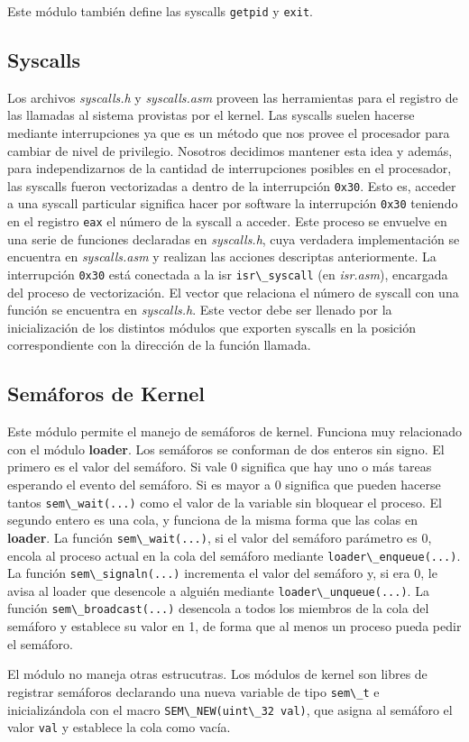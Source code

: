 \documentclass[a4paper]{article}
\newcommand{\file}[1]{\textit{#1}}
\newcommand{\func}[1]{\lstinline{#1}}
\begin{document}
Este módulo también define las syscalls \func{getpid} y \func{exit}.


\subsection{Syscalls}

Los archivos \file{syscalls.h} y \file{syscalls.asm} proveen las herramientas para el registro de las llamadas al sistema provistas por el kernel. Las syscalls suelen hacerse mediante interrupciones ya que es un método que nos provee el procesador para cambiar de nivel de privilegio. Nosotros decidimos mantener esta idea y además, para independizarnos de la cantidad de interrupciones posibles en el procesador, las syscalls fueron vectorizadas a dentro de la interrupción \func{0x30}. Esto es, acceder a una syscall particular significa hacer por software la interrupción \func{0x30} teniendo en el registro \func{eax} el número de la syscall a acceder. Este proceso se envuelve en una serie de funciones declaradas en \file{syscalls.h}, cuya verdadera implementación se encuentra en \file{syscalls.asm} y realizan las acciones descriptas anteriormente. La interrupción \func{0x30} está conectada a la isr \func{isr\_syscall} (en \file{isr.asm}), encargada del proceso de vectorización. El vector que relaciona el número de syscall con una función se encuentra en \file{syscalls.h}. Este vector debe ser llenado por la inicialización de los distintos módulos que exporten syscalls en la posición correspondiente con la dirección de la función llamada. 

\subsection{Semáforos de Kernel}

Este módulo permite el manejo de semáforos de kernel. Funciona muy relacionado con el módulo \textbf{loader}. Los semáforos se conforman de dos enteros sin signo. El primero es el valor del semáforo. Si vale 0 significa que hay uno o más tareas esperando el evento del semáforo. Si es mayor a 0 significa que pueden hacerse tantos \func{sem\_wait(...)} como el valor de la variable sin bloquear el proceso. El segundo entero es una cola, y funciona de la misma forma que las colas en \textbf{loader}. La función \func{sem\_wait(...)}, si el valor del semáforo parámetro es 0, encola al proceso actual en la cola del semáforo mediante \func{loader\_enqueue(...)}. La función \func{sem\_signaln(...)} incrementa el valor del semáforo y, si era 0, le avisa al loader que desencole a alguién mediante \func{loader\_unqueue(...)}. La función \func{sem\_broadcast(...)} desencola a todos los miembros de la cola del semáforo y establece su valor en 1, de forma que al menos un proceso pueda pedir el semáforo. 

El módulo no maneja otras estrucutras. Los módulos de kernel son libres de registrar semáforos declarando una nueva variable de tipo \func{sem\_t} e inicializándola con el macro \func{SEM\_NEW(uint\_32 val)}, que asigna al semáforo el valor \func{val} y establece la cola como vacía. 
\end{document}
